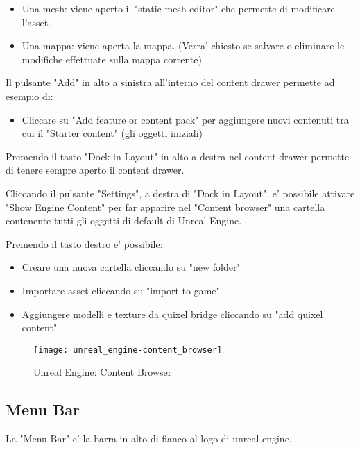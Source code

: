             \begin{itemize}
                \item Una mesh: viene aperto il "static mesh editor" che permette di modificare l'asset.
                \item Una mappa: viene aperta la mappa. (Verra' chiesto se salvare o eliminare le modifiche effettuate sulla mappa corrente)
            \end{itemize}

            Il pulsante "Add" in alto a sinistra all'interno del content drawer permette ad esempio di:
            \begin{itemize}
                \item Cliccare su "Add feature or content pack" per aggiungere nuovi contenuti tra cui il "Starter content" (gli oggetti iniziali)
            \end{itemize}

            Premendo il tasto "Dock in Layout" in alto a destra nel content drawer permette di tenere sempre aperto il content drawer.

            Cliccando il pulsante "Settings", a destra di "Dock in Layout", e' possibile attivare "Show Engine Content" per far apparire nel "Content browser" una cartella contenente tutti gli oggetti di default di Unreal Engine.

            Premendo il tasto destro e' possibile:
            \begin{itemize}
                \item Creare una nuova cartella cliccando su "new folder"
                \item Importare asset cliccando su "import to game"
                \item Aggiungere modelli e texture da quixel bridge cliccando su "add quixel content"
            \end{itemize}

            \begin{figure}[h]
                \caption{Unreal Engine: Content Browser}
                \centering
                \texttt{[image: unreal\_engine-content\_browser]}
                \label{fig:unreal_engine_content_browser}
            \end{figure}

        \subsection{Menu Bar}
            La "Menu Bar" e' la barra in alto di fianco al logo di unreal engine.

